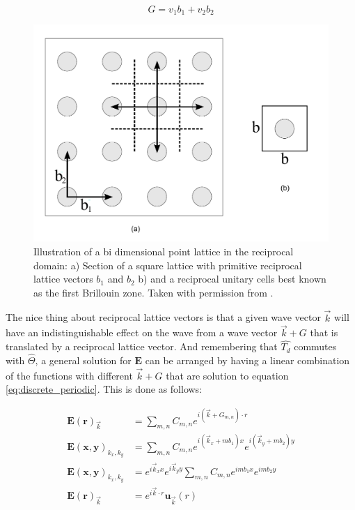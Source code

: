 \[G = v_1b_1+v_2b_2\]

\begin{figure}
\centering
\includegraphics[scale=.5]{./img/squarer.pdf}
\caption{Illustration of a bi dimensional point lattice in the reciprocal domain: a) Section of a square lattice with primitive reciprocal lattice vectors $b_1$ and $b_2$ b)  and a reciprocal unitary cells best known as the first Brillouin zone. Taken with permission from \cite{Guarin2012}.}
\end{figure}

The nice thing about reciprocal lattice vectors is that a given wave vector $\vec{k}$ will have an indistinguishable effect on the wave from a wave vector $\vec{k} + G$ that is translated by a reciprocal lattice vector.  And remembering that $\hat{T_d}$ commutes with $\hat{\Theta}$, a general solution for $\mathbf{E}$ can be arranged by having a linear combination of the functions with different $\vec{k} + G$ that are solution to equation \ref{eq:discrete_periodic}. This is done as follows:

\begin{align*}
\mathbf{E(r)}_{\vec{k}} &= \sum_{m,n}C_{m,n}e^{i(\vec{k}+G_{m,n})\cdot r}\\
\mathbf{E(x,y)}_{k_x,k_y} &= \sum_{m,n}C_{m,n}e^{i(\vec{k}_x + mb_1)x}e^{i(\vec{k}_y + mb_2)y}\\
\mathbf{E(x,y)}_{k_x,k_y} &= e^{i\vec{k}_x x}e^{i\vec{k}_y y}\sum_{m,n}C_{m,n}e^{imb_1x}e^{imb_2y}\\
\mathbf{E(r)}_{\vec{k}} &= e^{i\vec{k}\cdot r} \mathbf{u}_{\vec{k}}(r)
\end{align*}

